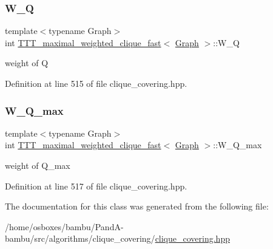 \subsubsection{\texorpdfstring{W\+\_\+Q}{W\_Q}}
{\footnotesize\ttfamily template$<$typename Graph$>$ \\
int \hyperlink{classTTT__maximal__weighted__clique__fast}{T\+T\+T\+\_\+maximal\+\_\+weighted\+\_\+clique\+\_\+fast}$<$ \hyperlink{structGraph}{Graph} $>$\+::W\+\_\+Q\hspace{0.3cm}{\ttfamily [private]}}



weight of Q 



Definition at line 515 of file clique\+\_\+covering.\+hpp.

\mbox{\label{classTTT__maximal__weighted__clique__fast_a3d82b95e1649b6576ef96cc5b2286835}} 
\subsubsection{\texorpdfstring{W\+\_\+\+Q\+\_\+max}{W\_Q\_max}}
{\footnotesize\ttfamily template$<$typename Graph$>$ \\
int \hyperlink{classTTT__maximal__weighted__clique__fast}{T\+T\+T\+\_\+maximal\+\_\+weighted\+\_\+clique\+\_\+fast}$<$ \hyperlink{structGraph}{Graph} $>$\+::W\+\_\+\+Q\+\_\+max\hspace{0.3cm}{\ttfamily [private]}}



weight of Q\+\_\+max 



Definition at line 517 of file clique\+\_\+covering.\+hpp.



The documentation for this class was generated from the following file\+:\begin{DoxyCompactItemize}
\item 
/home/osboxes/bambu/\+Pand\+A-\/bambu/src/algorithms/clique\+\_\+covering/\hyperlink{clique__covering_8hpp}{clique\+\_\+covering.\+hpp}\end{DoxyCompactItemize}
